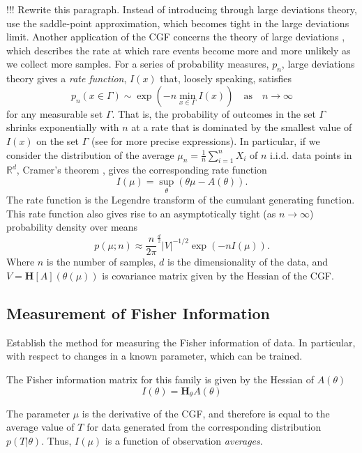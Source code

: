\documentclass[11pt]{article}      %
\begin{document}
!!! Rewrite this paragraph. Instead of introducing through large deviations theory, use the saddle-point approximation, which becomes tight in the large deviations limit.
Another application of the CGF concerns the theory of large deviations \cite{dembo2009large}, which describes the rate at which rare events become more and more unlikely as we collect more samples. 
For a series of probability measures, $p_n$, large deviations theory gives a \textit{rate function}, $I(x)$ that, loosely speaking, satisfies
\begin{equation}
  p_n(x \in \Gamma) \sim \exp \left( - n \min_{x \in \Gamma} I(x) \right) \quad \textrm{as} \quad n \to \infty 
\end{equation}
for any measurable set $\Gamma$.
That is, the probability of outcomes in the set $\Gamma$ shrinks exponentially with $n$ at a rate that is dominated by the smallest value of $I(x)$ on the set $\Gamma$ (see \cite{dembo2009large} for more precise expressions).
In particular, if we consider the distribution of the average $\mu_n = \frac{1}{n} \sum_{i=1}^n X_i$ of $n$ i.i.d. data points in $\mathbb{R}^d$, Cramer's theorem \cite{dembo2009large}, gives the corresponding rate function
\begin{equation}
  I(\mu) = \sup_{\theta}( \theta \mu - A(\theta) ).
\end{equation}
The rate function is the Legendre transform of the cumulant generating function.
This rate function also gives rise to an asymptotically tight (as $n \to \infty$) probability density over means \cite{iltis_sharp_1995,chaganty_multidimensional_1986}
\begin{equation}
  p(\mu; n) \approx \frac{n}{2\pi}^{\frac{d}{2}} |V|^{-1/2} \exp(-n I(\mu)). 
\end{equation}
Where $n$ is the number of samples, $d$ is the dimensionality of the data, and $V = {\bm H}[A](\theta(\mu))$ is covariance matrix given by the Hessian of the CGF.



\subsection{Measurement of Fisher Information}

Establish the method for measuring the Fisher information of data. In particular, with respect to changes in a known parameter, which can be trained.



The Fisher information matrix for this family is given by the Hessian of $A(\theta)$ 
\begin{equation}
  I(\theta) = \bm{H}_\theta A(\theta) 
\end{equation}

The parameter $\mu$ is the derivative of the CGF, and therefore is equal to the average value of $T$ for data generated from the corresponding distribution $p(T|\theta)$.
Thus, $I(\mu)$ is a function of observation \textit{averages}.




\end{document}

